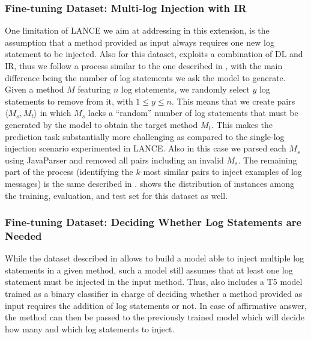 \subsubsection{Fine-tuning Dataset: Multi-log Injection with IR} \label{sec:multi-log-dataset}

One limitation of LANCE \cite{mastropaolo2022using} we aim at addressing in this extension, is the assumption that a \java method provided as input always requires one new log statement to be injected. Also for this dataset, \approach exploits a combination of DL and IR, thus we follow a process similar to the one described in , with the main difference being the number of log statements we ask the model to generate. Given a method $M$ featuring $n$ log statements, we randomly select $y$ log statements to remove from it, with $1 \leq y \leq n$. This means that we create pairs $\langle M_s, M_t \rangle$ in which $M_s$ lacks a ``random'' number of log statements that must be generated by the model to obtain the target method $M_t$. This makes the prediction task substantially more challenging as compared to the single-log injection scenario experimented in LANCE. Also in this case we parsed each $M_s$ using JavaParser \cite{javaparser} and removed all pairs including an invalid $M_s$. The remaining part of the process (\ie identifying the $k$ most similar pairs to inject examples of log messages) is the same described in .  shows the distribution of instances among the training, evaluation, and test set for this dataset as well.


\subsubsection{Fine-tuning Dataset: Deciding Whether Log Statements are Needed} \label{sec:predicting-dataset}

While the dataset described in  allows to build a model able to inject multiple log statements in a given \java method, such a model still assumes that at least one log statement must be injected in the input method. Thus, \approach also includes a T5 model trained as a binary classifier in charge of deciding whether a method provided as input requires the addition of log statements or not. In case of affirmative answer, the method can then be passed to the previously trained model which will decide how many and which log statements to inject.


